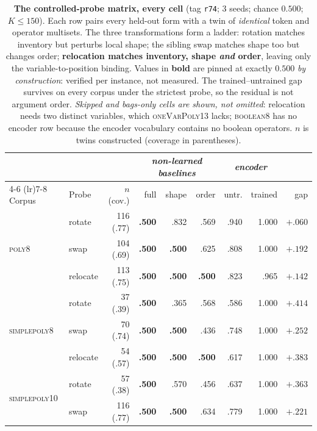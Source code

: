 \begin{table}[H]
\centering
\caption{\textbf{The controlled-probe matrix, every cell} (tag \texttt{r74}; 3 seeds; chance $0.500$;
$K \leq 150$). Each row pairs every held-out form with a twin of \emph{identical} token and operator
multisets. The three transformations form a ladder: rotation matches inventory but perturbs local
shape; the sibling swap matches shape too but changes order; \textbf{relocation matches inventory,
shape \emph{and} order}, leaving only the variable-to-position binding. Values in \textbf{bold} are
pinned at exactly $0.500$ \emph{by construction}: verified per instance, not measured. The
trained--untrained gap survives on every corpus under the strictest probe, so the residual is not
argument order. \emph{Skipped and bags-only cells are shown, not omitted}: relocation needs two
distinct variables, which \textsc{oneVarPoly13} lacks; \textsc{boolean8} has no encoder row because
the encoder vocabulary contains no boolean operators. $n$ is twins constructed (coverage in
parentheses).}
\label{tab:probes_full}
\small
\setlength{\tabcolsep}{4.5pt}
\begin{tabular}{l l r rrr rr r}
\toprule
& & & \multicolumn{3}{c}{\emph{non-learned baselines}} & \multicolumn{2}{c}{\emph{encoder}} & \\
\cmidrule(lr){4-6} \cmidrule(lr){7-8}
Corpus & Probe & $n$ (cov.) & full & shape & order & untr. & trained & gap \\
\midrule
\multirow{3}{*}{\textsc{poly8}}
 & rotate   & 116 (.77) & \textbf{.500} & .832 & .569 & .940 & 1.000 & $+.060$ \\
 & swap     & 104 (.69) & \textbf{.500} & \textbf{.500} & .625 & .808 & 1.000 & $+.192$ \\
 & relocate & 113 (.75) & \textbf{.500} & \textbf{.500} & \textbf{.500} & .823 & .965 & $\mathbf{+.142}$ \\
\midrule
\multirow{3}{*}{\textsc{simplepoly8}}
 & rotate   &  37 (.39) & \textbf{.500} & .365 & .568 & .586 & 1.000 & $+.414$ \\
 & swap     &  70 (.74) & \textbf{.500} & \textbf{.500} & .436 & .748 & 1.000 & $+.252$ \\
 & relocate &  54 (.57) & \textbf{.500} & \textbf{.500} & \textbf{.500} & .617 & 1.000 & $\mathbf{+.383}$ \\
\midrule
\multirow{3}{*}{\textsc{simplepoly10}}
 & rotate   &  57 (.38) & \textbf{.500} & .570 & .456 & .637 & 1.000 & $+.363$ \\
 & swap     & 116 (.77) & \textbf{.500} & \textbf{.500} & .634 & .779 & 1.000 & $+.221$ \\

\end{tabular}
\end{table}
